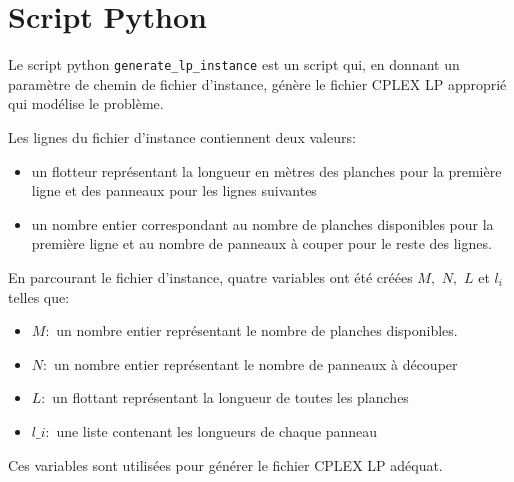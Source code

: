 \documentclass{article}[A4]
\begin{document}
\section{Script Python}
Le script python \texttt{generate\_lp\_instance} est un script qui, 
en donnant un paramètre de chemin de fichier d'instance, génère le 
fichier CPLEX LP approprié qui modélise le problème.

Les lignes du fichier d'instance contiennent deux valeurs:
\begin{itemize}
	\item un flotteur représentant la longueur en mètres des planches 
	pour la première ligne et des panneaux pour les lignes suivantes
	\item un nombre entier correspondant au nombre de planches 
	disponibles pour la première ligne et au nombre de panneaux à 
	couper pour le reste des lignes.
\end{itemize}

En parcourant le fichier d'instance, quatre variables ont été créées $M,$
 $N,$ $L$ et $l_i$ telles que:
\begin{itemize}
	\item[] $M:$ un nombre entier représentant le nombre de planches
	disponibles.
	\item[] $N:$ un nombre entier représentant le nombre de panneaux à 
	découper
	\item[] $L:$ un flottant représentant la longueur de toutes les 
	planches 
	\item[] \texttt{$l\_i:$} une liste contenant les longueurs de chaque panneau
\end{itemize} 

Ces variables sont utilisées pour générer le fichier CPLEX LP adéquat. 
\end{document}
